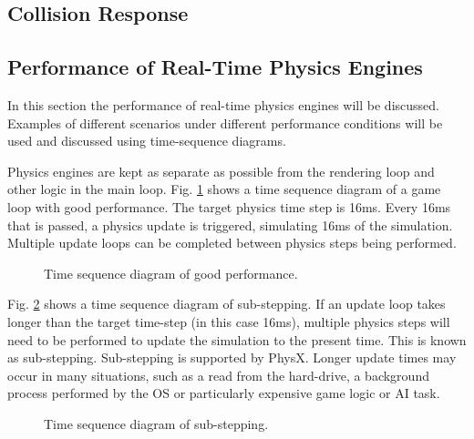 
\subsection{Collision Response}


\subsection{Performance of Real-Time Physics Engines}
In this section the performance of real-time physics engines will be discussed. Examples of different scenarios under different performance conditions will be used and discussed using time-sequence diagrams.

Physics engines are kept as separate as possible from the rendering loop and other logic in the main loop. Fig. \ref{GoodPerf} shows a time sequence diagram of a game loop with good performance. The target physics time step is 16ms. Every 16ms that is passed, a physics update is triggered, simulating 16ms of the simulation. Multiple update loops can be completed between physics steps being performed.

\begin{figure}
	\centering
	
	\caption{Time sequence diagram of good performance.}
	\label{GoodPerf}
\end{figure}

Fig. \ref{SubStep} shows a time sequence diagram of sub-stepping. If an update loop takes longer than the target time-step (in this case 16ms), multiple physics steps will need to be performed to update the simulation to the present time. This is known as sub-stepping. Sub-stepping is supported by PhysX. Longer update times may occur in many situations, such as a read from the hard-drive, a background process performed by the OS or particularly expensive game logic or AI task.

\begin{figure}
	\centering
	
	\caption{Time sequence diagram of sub-stepping.}
	\label{SubStep}
\end{figure}

